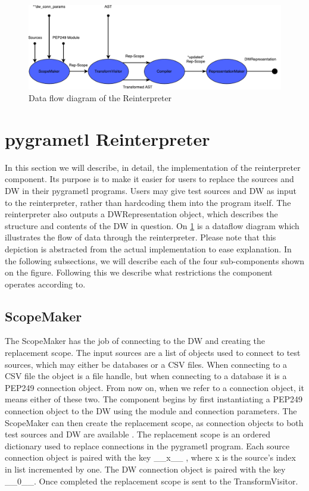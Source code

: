 \begin{figure}
\centering
\includegraphics[width=\textwidth]{figures/reinterpreter.pdf}
\caption{Data flow diagram of the Reinterpreter}
\label{fig:reinterpreter}
\end{figure}
\section{pygrametl Reinterpreter}\label{sec:dwpopulator}

In this section we will describe, in detail, the implementation of the reinterpreter component. Its purpose is to make it easier for users to replace the sources and DW in their pygrametl programs. Users may give test sources and DW as input to the reinterpreter, rather than hardcoding them into the program itself. The reinterpreter also outputs a DWRepresentation object, which describes the structure and contents of the DW in question. On \cref{fig:reinterpreter} is a dataflow diagram which illustrates the flow of data through the reinterpreter. Please note that this depiction is abstracted from the actual implementation to ease explanation. In the following subsections, we will describe each of the four sub-components shown on the figure. Following this we describe what restrictions the component operates according to.

\subsection{ScopeMaker}
The ScopeMaker has the job of connecting to the DW and creating the replacement scope. The input sources are a list of objects used to connect to test sources, which may either be databases or a CSV files. When connecting to a CSV file the object is a file handle, but when connecting to a database it is a PEP249 connection object. From now on, when we refer to a connection object, it means either of these two. The component begins by first instantiating a PEP249 connection object to the DW using the module and connection parameters. The ScopeMaker can then create the replacement scope, as connection objects to both test sources and DW are available . The replacement scope is an ordered dictionary used to replace connections in the pygrametl program. Each source connection object is paired with the key \_\_x\_\_ , where x is the source's index in list incremented by one. The DW connection object is paired with the key \_\_0\_\_. Once completed the replacement scope is sent to the TransformVisitor.

